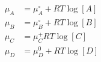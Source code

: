 \begin{eqnarray}\label{eqn:chemical-potential}
\mu_A & = \mu_A^\circ + RT\log [A] \\
\mu_B & = \mu_B^\circ + RT\log [B] \\
\mu_C & = \mu_C^+ RT\log [C] \\
\mu_D & = \mu_D^0 + RT\log [D] \\
\end{eqnarray}